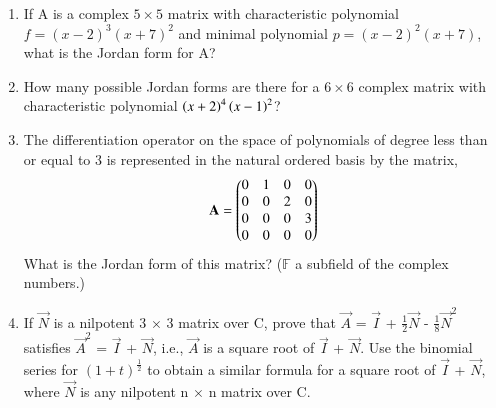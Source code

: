 \renewcommand{\theequation}{\theenumi}
\renewcommand{\thefigure}{\theenumi}
\begin{enumerate}[label=\thesubsection.\arabic*.,ref=\thesubsection.\theenumi]

\item If A is a complex $5 \times 5$ matrix with characteristic polynomial $f = (x-2)^3 (x+7)^2$ and minimal polynomial $p = (x-2)^2 (x+7)$, what is the Jordan form for A? 
%
\\
\solution

\item How many possible Jordan forms are there for a $6\times6$ complex matrix with characteristic polynomial $\left(x+2\right)^4\left(x-1\right)^2$?
%
\\
\solution


\item The differentiation operator on the space of polynomials of degree less than or equal to 3 is represented in the natural ordered basis by the matrix,
\begin{align}
\mathbf{A} = \begin{pmatrix}0&1&0&0\\0&0&2&0\\0&0&0&3\\0&0&0&0\end{pmatrix}
\end{align}
What is the Jordan form of this matrix? ($\mathbb{F}$ a subfield of the complex numbers.) 
%
%
\\
\solution

\item If $\vec{N}$ is a nilpotent 3 $\times$ 3 matrix over C, prove that $\vec{A}$ = $\vec{I}$ + $\frac{1}{2}\vec{N}$ - $\frac{1}{8}\vec{N}^{2}$ satisfies $\vec{A}^2$ = $\vec{I}$ + $\vec{N}$, i.e., $\vec{A}$ is a square root of $\vec{I}$ + $\vec{N}$. Use the binomial series for $(1 + t)^\frac{1}{2}$ to obtain a similar formula for a square root of $\vec{I}$ + $\vec{N}$, where $\vec{N}$ is any nilpotent n $\times$ n matrix over C.
%
\\
\solution



\end{enumerate}
